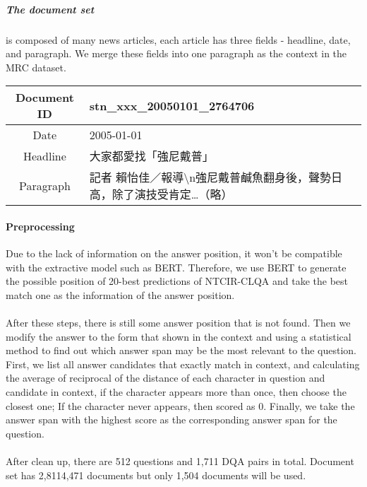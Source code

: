 \documentclass{article}
\begin{document}
\subparagraph{The document set} is composed of many news articles, each article has three fields - headline, date, and paragraph. We merge these fields into one paragraph as the context in the MRC dataset.
\begin{CJK*}{UTF8}{bsmi}
  \begin{table}[ht!]
    \centering
    \begin{tabular}{|c|l|}
    \hline
    Document ID & stn\_xxx\_20050101\_2764706 \\ \hline
    Date & 2005-01-01 \\ \hline
    Headline & 大家都愛找「強尼戴普」 \\ \hline
    Paragraph & 記者 賴怡佳／報導\textbackslash{}n強尼戴普鹹魚翻身後，聲勢日高，除了演技受肯定…（略） \\ \hline
    \end{tabular}
  \end{table}
\end{CJK*}

\paragraph{Preprocessing}
Due to the lack of information on the answer position, it won't be compatible with the extractive model such as BERT. Therefore, we use BERT to generate the possible position of 20-best predictions of NTCIR-CLQA and take the best match one as the information of the answer position.

\paragraph{}
After these steps, there is still some answer position that is not found. Then we modify the answer to the form that shown in the context and using a statistical method to find out which answer span may be the most relevant to the question. First, we list all answer candidates that exactly match in context, and calculating the average of reciprocal of the distance of each character in question and candidate in context, if the character appears more than once, then choose the closest one; If the character never appears, then scored as 0. Finally, we take the answer span with the highest score as the corresponding answer span for the question.

\paragraph{}
After clean up, there are 512 questions and 1,711 DQA pairs in total. Document set has 2,8114,471 documents but only 1,504 documents will be used.
\end{document}
